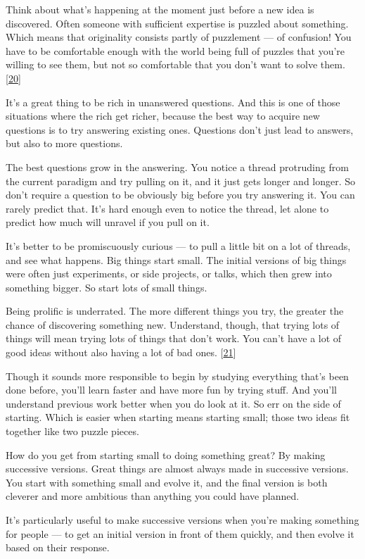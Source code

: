 Think about what's happening at the moment just before a new idea is
discovered. Often someone with sufficient expertise is puzzled about
something. Which means that originality consists partly of puzzlement
--- of confusion! You have to be comfortable enough with the world being
full of puzzles that you're willing to see them, but not so comfortable
that you don't want to solve them. {[}\hyperref[f20n]{20}{]}

It's a great thing to be rich in unanswered questions. And this is one
of those situations where the rich get richer, because the best way to
acquire new questions is to try answering existing ones. Questions don't
just lead to answers, but also to more questions.

The best questions grow in the answering. You notice a thread protruding
from the current paradigm and try pulling on it, and it just gets longer
and longer. So don't require a question to be obviously big before you
try answering it. You can rarely predict that. It's hard enough even to
notice the thread, let alone to predict how much will unravel if you
pull on it.

It's better to be promiscuously curious --- to pull a little bit on a
lot of threads, and see what happens. Big things start small. The
initial versions of big things were often just experiments, or side
projects, or talks, which then grew into something bigger. So start lots
of small things.

Being prolific is underrated. The more different things you try, the
greater the chance of discovering something new. Understand, though,
that trying lots of things will mean trying lots of things that don't
work. You can't have a lot of good ideas without also having a lot of
bad ones. {[}\hyperref[f21n]{21}{]}

Though it sounds more responsible to begin by studying everything that's
been done before, you'll learn faster and have more fun by trying stuff.
And you'll understand previous work better when you do look at it. So
err on the side of starting. Which is easier when starting means
starting small; those two ideas fit together like two puzzle pieces.

How do you get from starting small to doing something great? By making
successive versions. Great things are almost always made in successive
versions. You start with something small and evolve it, and the final
version is both cleverer and more ambitious than anything you could have
planned.

It's particularly useful to make successive versions when you're making
something for people --- to get an initial version in front of them
quickly, and then evolve it based on their response.

